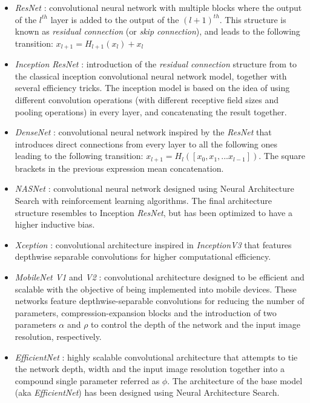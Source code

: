 \documentclass{elsarticle}
\begin{document}
    \begin{itemize}
    	\item \textit{ResNet} \cite{he2016}: convolutional neural network with multiple blocks where the output of the $l^{th}$ layer is added to the output of the $(l+1)^{th}$. This structure is known as \textit{residual connection} (or \textit{skip connection}), and leads to the following transition: $x_{l+1} = H_{l+1}(x_{l}) + x_l$
    	\item \textit{Inception ResNet} \cite{szegedy2017}: introduction of the \textit{residual connection} structure from \cite{he2016} to the classical inception convolutional neural network model, together with several efficiency tricks. The inception model is based on the idea of using different convolution operations (with different receptive field sizes and pooling operations) in every layer, and concatenating the result together. 
    	\item \textit{DenseNet} \cite{huang2017}: convolutional neural network inspired by the \textit{ResNet} \cite{he2016} that introduces direct connections from every layer to all the following ones leading to the following transition: $x_{l+1} = H_l([x_0, x_1, ... x_{l-1}])$. The square brackets in the previous expression mean concatenation. 
    	\item \textit{NASNet} \cite{pham2018}: convolutional neural network designed using Neural Architecture Search with reinforcement learning algorithms. The final architecture structure resembles to Inception \textit{ResNet}, but has been optimized to have a higher inductive bias.
    	\item \textit{Xception} \cite{chollet2017}: convolutional architecture inspired in \textit{InceptionV3}  \cite{szegedy2016} that features depthwise separable convolutions for higher computational efficiency.
    	\item \textit{MobileNet V1} and \textit{V2} \cite{howard2017, sandler2018}: convolutional architecture designed to be efficient and scalable with the objective of being implemented into mobile devices. These networks feature depthwise-separable convolutions for reducing the number of parameters, compression-expansion blocks and the introduction of two parameters $\alpha$ and $\rho$ to control the depth of the network and the input image resolution, respectively.
    	\item \textit{EfficientNet} \cite{tan2019}: highly scalable convolutional architecture that attempts to tie the network depth, width and the input image resolution  together into a compound single parameter referred as $\phi$. The architecture of the base model (aka \textit{EfficientNet}) has been designed using Neural Architecture Search.
    \end{itemize}
	
\end{document}
